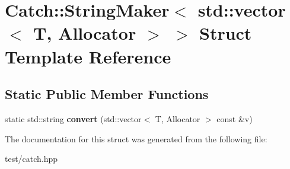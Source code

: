 \hypertarget{structCatch_1_1StringMaker_3_01std_1_1vector_3_01T_00_01Allocator_01_4_01_4}{}\section{Catch\+:\+:String\+Maker$<$ std\+:\+:vector$<$ T, Allocator $>$ $>$ Struct Template Reference}
\label{structCatch_1_1StringMaker_3_01std_1_1vector_3_01T_00_01Allocator_01_4_01_4}
\subsection*{Static Public Member Functions}
\begin{DoxyCompactItemize}
\item 
static std\+::string {\bfseries convert} (std\+::vector$<$ T, Allocator $>$ const \&v)\hypertarget{structCatch_1_1StringMaker_3_01std_1_1vector_3_01T_00_01Allocator_01_4_01_4_adc7dc716733cea8777497257ae22e62d}{}\label{structCatch_1_1StringMaker_3_01std_1_1vector_3_01T_00_01Allocator_01_4_01_4_adc7dc716733cea8777497257ae22e62d}

\end{DoxyCompactItemize}


The documentation for this struct was generated from the following file\+:\begin{DoxyCompactItemize}
\item 
test/catch.\+hpp\end{DoxyCompactItemize}
